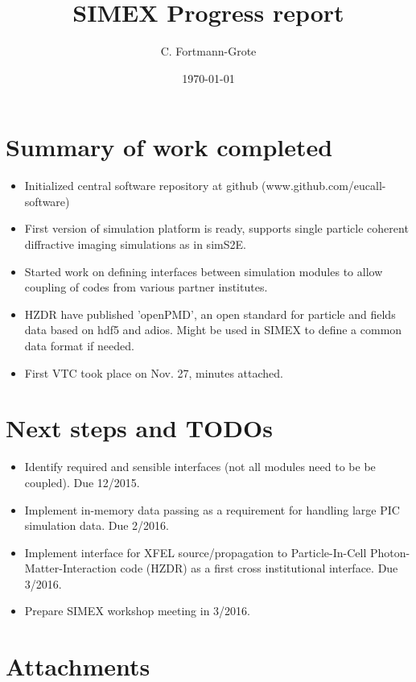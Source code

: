 \documentclass[a4paper]{article}
\begin{document}
\title{SIMEX Progress report}
\author{C. Fortmann-Grote}
\date{\today}

\maketitle
\section{Summary of work completed}

\begin{itemize}
  \item Initialized central software repository at github
    (www.github.com/eucall-software)
  \item First version of simulation platform is ready, supports single
    particle coherent diffractive imaging simulations as in simS2E.
  \item Started work on defining interfaces between simulation
    modules to allow coupling of codes from various partner
    institutes.
  \item HZDR have published 'openPMD', an open standard for particle
    and fields data based on hdf5 and adios. Might be used in SIMEX
    to define a common data format if needed.
  \item First VTC took place on Nov. 27, minutes attached.
\end{itemize}

\section{Next steps and TODOs}
\begin{itemize}
  \item Identify required and sensible interfaces (not all modules
    need to be be coupled). Due 12/2015.
  \item Implement in-memory data passing as a requirement for
    handling large PIC simulation data. Due 2/2016.
  \item Implement interface for XFEL source/propagation to Particle-In-Cell
    Photon-Matter-Interaction code (HZDR) as a
    first cross institutional interface. Due 3/2016.
  \item Prepare SIMEX workshop meeting in 3/2016.

\end{itemize}
    \newpage
    \section{Attachments}
\end{document}
